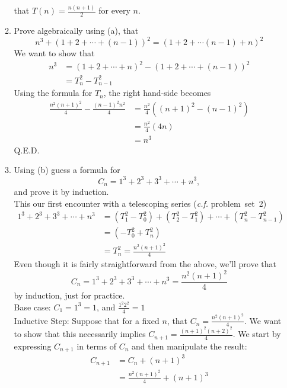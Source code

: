 \documentclass[12pt]{amsart}
\begin{document}
\begin{enumerate}
\begin{enumerate}
    that $T(n) = \frac{n(n+1)}{2}$ for every $n$.
    \item Prove algebraically using (a), that
    \[
        n^{3} + (1+2+\cdots +(n - 1))^{2}
            = (1+2+\cdots (n-1) +  n)^{2}
    \]
    We want to show that
    \begin{align*}
        n^3 &=(1+2+\cdots +n)^{2} - (1+2+\cdots +(n - 1))^{2} \\
            & = T_n^2 - T_{n-1}^2
    \end{align*}
    Using the formula for $T_n$, the right hand-side becomes
    \begin{align*}
       \frac{n^2(n+1)^2}{4} - \frac{(n-1)^2n^2}{4} &= \frac{n^2}{4} ( (n+1)^2 - (n-1)^2) \\
                                                   &= \frac{n^2}{4} ( 4n) \\
                                                   &= n^3
    \end{align*}
    Q.E.D.
    \item
    Using (b) guess a formula for
    \[
    C_n = 1^{3} + 2^{3} + 3^{3} + \cdots  +  n^{3},
    \]
    and prove it by induction.\\
    This our first encounter with  a telescoping series ({\em c.f. } problem~set~2)
   \begin{align*}
        1^{3} + 2^{3} + 3^{3} + \cdots  +  n^{3} & =
          (T_1^2 - T_0^2) + (T_2^2 -T_1^2)  + \cdots  + (T_n^2 - T_{n-1}^2) \\
            &= ( -T_0^2 + T_n^2 )\\
         &= T_n^2 = \frac{n^2(n+1)^2}{4}
  \end{align*}
    Even though it is fairly straightforward from the above, we'll prove that
    \[
     C_n = 1^{3} + 2^{3} + 3^{3} + \cdots  +  n^{3} = \frac{n^2(n+1)^2}{4}
    \]
    by induction, just for practice. \\
    Base case: $C_1 = 1^3 =1$, and  $\frac{1^2 2^2}{4} = 1$ \\
    Inductive Step: Suppose that for a fixed $n$, that $C_n = \frac{n^2(n+1)^2}{4}$.
    We want to show that this necessarily implies $C_{n+1} = \frac{(n+1)^2(n+2)^2}{4}$. We start
    by expressing $C_{n+1}$ in terms of $C_n$ and then manipulate the result:
    \begin{align*}
    C_{n+1} & = C_n + (n+1)^3\\
            & = \frac{n^2(n+1)^2}{4} + (n+1)^3 \\

\end{align*}
\end{enumerate}
\end{enumerate}
\end{document}
